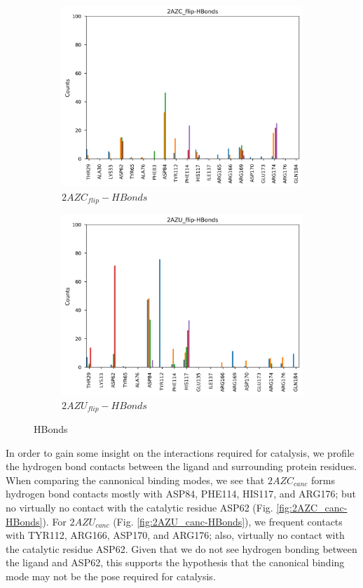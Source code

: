 \documentclass[fleqn,10pt]{wlscirep}
\begin{document}
\begin{figure}[!ht]
\begin{subfigure}{.45\textwidth}
     \includegraphics[width=.95\linewidth]{2AZC_flip/2AZC_flip-HBonds.png}
     \caption{$2AZC_{flip}-HBonds$}
     \label{fig:2AZC_flip-HBonds}
   \end{subfigure}
    \begin{subfigure}{.45\textwidth}
     \centering
     \includegraphics[width=.95\linewidth]{2AZU_flip/2AZU_flip-HBonds.png}
     \caption{$2AZU_{flip}-HBonds$}
     \label{fig:2AZU_flip-HBonds}
   \end{subfigure}
\caption{HBonds}
\label{fig:HBonds}
\end{figure}  

In order to gain some insight on the interactions required for catalysis, we profile the hydrogen bond contacts between the ligand and surrounding protein residues.
When comparing the cannonical binding modes, we see that $2AZC_{canc}$ forms hydrogen bond contacts mostly with ASP84, PHE114, HIS117, and ARG176; but no virtually no contact with the catalytic residue ASP62 (Fig. \ref{fig:2AZC_canc-HBonds}).
For $2AZU_{canc}$ (Fig. \ref{fig:2AZU_canc-HBonds}), we frequent contacts with TYR112, ARG166, ASP170, and ARG176; also, virtually no contact with the catalytic residue ASP62.
Given that we do not see hydrogen bonding between the ligand and ASP62, this supports the hypothesis that the canonical binding mode may not be the pose required for catalysis.
\end{document}
